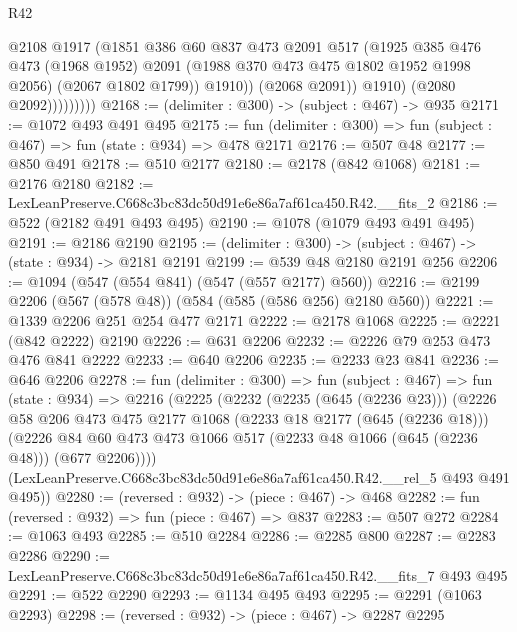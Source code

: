 \begin{lexlean}{R42}
\begin{coremodule}
                          @2108
                          @1917
                          (@1851
                            @386
                            @60
                            @837
                            @473
                            @2091
                            @517
                            (@1925
                              @385
                              @476
                              @473
                              (@1968 @1952)
                              @2091
                              (@1988 @370 @473 @475 @1802 @1952 @1998 @2056)
                              (@2067 @1802 @1799))
                            @1910))
                        (@2068 @2091))
                      @1910)
                    (@2080 @2092)))))))))
@2168 := (delimiter : @300) -> (subject : @467) -> @935
@2171 := @1072 @493 @491 @495
@2175 := fun (delimiter : @300) => fun (subject : @467) => fun (state : @934) => @478 @2171
@2176 := @507 @48
@2177 := @850 @491
@2178 := @510 @2177
@2180 := @2178 (@842 @1068)
@2181 := @2176 @2180
@2182 := LexLeanPreserve.C668c3bc83dc50d91e6e86a7af61ca450.R42.__fits_2
@2186 := @522 (@2182 @491 @493 @495)
@2190 := @1078 (@1079 @493 @491 @495)
@2191 := @2186 @2190
@2195 := (delimiter : @300) -> (subject : @467) -> (state : @934) -> @2181 @2191
@2199 := @539 @48 @2180 @2191 @256
@2206 := @1094 (@547 (@554 @841) (@547 (@557 @2177) @560))
@2216 := @2199 @2206 (@567 (@578 @48)) (@584 (@585 (@586 @256) @2180 @560))
@2221 := @1339 @2206 @251 @254 @477 @2171
@2222 := @2178 @1068
@2225 := @2221 (@842 @2222) @2190
@2226 := @631 @2206
@2232 := @2226 @79 @253 @473 @476 @841 @2222
@2233 := @640 @2206
@2235 := @2233 @23 @841
@2236 := @646 @2206
@2278 := fun (delimiter : @300) =>
  fun (subject : @467) =>
  fun (state : @934) =>
  @2216
    (@2225
      (@2232
        (@2235 (@645 (@2236 @23)))
        (@2226
          @58
          @206
          @473
          @475
          @2177
          @1068
          (@2233 @18 @2177 (@645 (@2236 @18)))
          (@2226 @84 @60 @473 @473 @1066 @517 (@2233 @48 @1066 (@645 (@2236 @48))) (@677 @2206))))
      (LexLeanPreserve.C668c3bc83dc50d91e6e86a7af61ca450.R42.__rel_5 @493 @491 @495))
@2280 := (reversed : @932) -> (piece : @467) -> @468
@2282 := fun (reversed : @932) => fun (piece : @467) => @837
@2283 := @507 @272
@2284 := @1063 @493
@2285 := @510 @2284
@2286 := @2285 @800
@2287 := @2283 @2286
@2290 := LexLeanPreserve.C668c3bc83dc50d91e6e86a7af61ca450.R42.__fits_7 @493 @495
@2291 := @522 @2290
@2293 := @1134 @495 @493
@2295 := @2291 (@1063 @2293)
@2298 := (reversed : @932) -> (piece : @467) -> @2287 @2295

\end{coremodule}
\end{lexlean}
